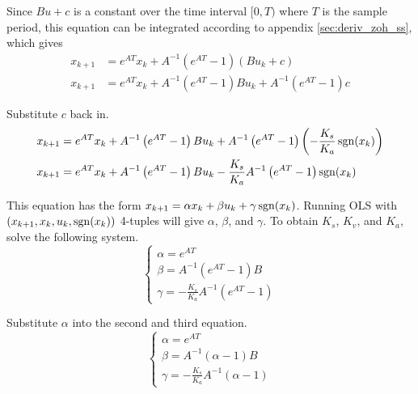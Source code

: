 Since $Bu + c$ is a constant over the time interval $[0, T)$ where $T$ is the
sample period, this equation can be integrated according to appendix
\ref{sec:deriv_zoh_ss}, which gives
\begin{align*}
  x_{k+1} &= e^{AT} x_k + A^{-1} (e^{AT} - 1) (Bu_k + c) \\
  x_{k+1} &= e^{AT} x_k + A^{-1} (e^{AT} - 1)Bu_k + A^{-1} (e^{AT} - 1)c
\end{align*}

Substitute $c$ back in.
\begin{align*}
  x_{k+1} &= e^{AT} x_k + A^{-1} \left(e^{AT} - 1\right) B u_k
    + A^{-1} \left(e^{AT} - 1\right) \left(-\frac{K_s}{K_a} \operatorname{sgn}(x_k)\right) \\
  x_{k+1} &= e^{AT} x_k +  A^{-1} \left(e^{AT} - 1\right) B u_k
    - \frac{K_s}{K_a} A^{-1} \left(e^{AT} - 1\right) \operatorname{sgn}(x_k)
\end{align*}

This equation has the form
$x_{k+1} = \alpha x_k + \beta u_k + \gamma \operatorname{sgn}(x_k)$. Running OLS with
$(x_{k+1}, x_k, u_k, \operatorname{sgn}(x_k))$ 4-tuples will give $\alpha$, $\beta$, and
$\gamma$. To obtain $K_s$, $K_v$, and $K_a$, solve the following system.
\begin{equation*}
  \begin{cases}
    \alpha = e^{AT} \\
    \beta = A^{-1} \left(e^{AT} - 1\right)B \\
    \gamma = -\frac{K_s}{K_a} A^{-1} \left(e^{AT} - 1\right)
  \end{cases}
\end{equation*}

Substitute $\alpha$ into the second and third equation.
\begin{equation}
  \begin{cases}
    \alpha = e^{AT} \\
    \beta = A^{-1} (\alpha - 1) B \\
    \gamma = -\frac{K_s}{K_a} A^{-1} (\alpha - 1)
  \end{cases} \label{eq:ols_system}
\end{equation}

